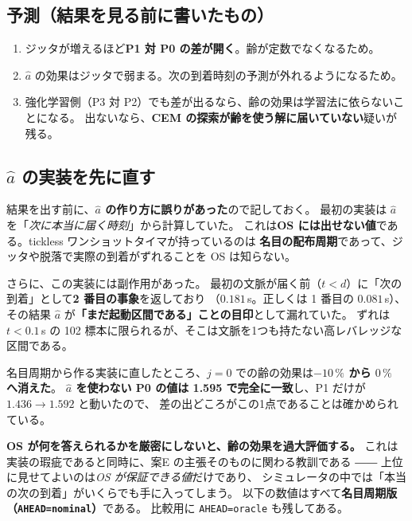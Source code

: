 \documentclass[11pt,a4paper]{article}
\newcommand{\code}[1]{\texttt{#1}}
\newcommand{\prob}[1]{\textbf{\textcolor{red!55!black}{#1}}}
\newcommand{\keyp}[1]{\textbf{\textcolor{blue!45!black}{#1}}}
\begin{document}
\subsection{予測（結果を見る前に書いたもの）}

\begin{enumerate}[leftmargin=1.8em,itemsep=2pt]
  \item ジッタが増えるほど\keyp{P1 対 P0 の差が開く}。齢が定数でなくなるため。
  \item $\hat a$ の効果はジッタで弱まる。次の到着時刻の予測が外れるようになるため。
  \item 強化学習側（P3 対 P2）でも差が出るなら、齢の効果は学習法に依らないことになる。
        出ないなら、\prob{CEM の探索が齢を使う解に届いていない}疑いが残る。
\end{enumerate}

\subsection{$\hat a$ の実装を先に直す}
\label{sec:ahead}

結果を出す前に、\prob{$\hat a$ の作り方に誤りがあった}ので記しておく。
最初の実装は $\hat a$ を「\emph{次に本当に届く時刻}」から計算していた。
これは\prob{OS には出せない値}である。tickless ワンショットタイマが持っているのは
\keyp{名目の配布周期}であって、ジッタや脱落で実際の到着がずれることを OS は知らない。

\noindent
さらに、この実装には副作用があった。
最初の文脈が届く前（$t<d$）に「次の到着」として\prob{2 番目の事象}を返しており
（$0.181$\,s。正しくは 1 番目の $0.081$\,s）、
その結果 $\hat a$ が\prob{「まだ起動区間である」ことの目印}として漏れていた。
ずれは $t<0.1$\,s の 102 標本に限られるが、そこは文脈を1つも持たない高レバレッジな区間である。

\noindent
名目周期から作る実装に直したところ、$j=0$ での齢の効果は\keyp{$-10\,\%$ から $0\,\%$ へ消えた}。
\keyp{$\hat a$ を使わない P0 の値は 1.595 で完全に一致}し、P1 だけが $1.436 \to 1.592$ と動いたので、
差の出どころがこの1点であることは確かめられている。

\medskip
\noindent
\keyp{OS が何を答えられるかを厳密にしないと、齢の効果を過大評価する。}
これは実装の瑕疵であると同時に、案E の主張そのものに関わる教訓である ――
上位に見せてよいのは\emph{OS が保証できる値}だけであり、
シミュレータの中では「本当の次の到着」がいくらでも手に入ってしまう。
以下の数値はすべて\keyp{名目周期版（\code{AHEAD=nominal}）}である。
比較用に \code{AHEAD=oracle} も残してある。
\end{document}
